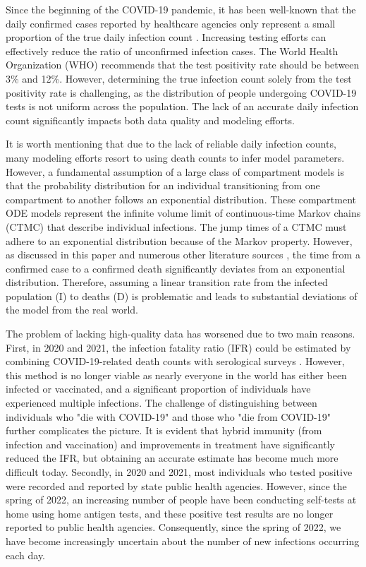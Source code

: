 \documentclass[sn-mathphys,Numbered]{sn-jnl}
\begin{document}
Since the beginning of the COVID-19 pandemic, it has been well-known that the daily confirmed cases reported by healthcare agencies only represent a small proportion of the true daily infection count \cite{wu2020substantial}. Increasing testing efforts can effectively reduce the ratio of unconfirmed infection cases. The World Health Organization (WHO) recommends that the test positivity rate should be between 3\% and 12\%. However, determining the true infection count solely from the test positivity rate is challenging, as the distribution of people undergoing COVID-19 tests is not uniform across the population. The lack of an accurate daily infection count significantly impacts both data quality and modeling efforts. 


It is worth mentioning that due to the lack of reliable daily infection counts, many modeling efforts resort to using death counts to infer model parameters. However, a fundamental assumption of a large class of compartment models is that the probability distribution for an individual transitioning from one compartment to another follows an exponential distribution. These compartment ODE models represent the infinite volume limit of continuous-time Markov chains (CTMC) that describe individual infections. The jump times of a CTMC must adhere to an exponential distribution because of the Markov property. However, as discussed in this paper and numerous other literature sources  \cite{scheiner2020mathematical,feng2007epidemiological,ghosh2022epidemic}, the time from a confirmed case to a confirmed death significantly deviates from an exponential distribution. Therefore, assuming a linear transition rate from the infected population (I) to deaths (D) is problematic and leads to substantial deviations of the model from the real world.

The problem of lacking high-quality data has worsened due to two main reasons. First, in 2020 and 2021, the infection fatality ratio (IFR) could be estimated by combining COVID-19-related death counts with serological surveys  \cite{IHME, brazeau2022estimating, meyerowitz2020systematic}. However, this method is no longer viable as nearly everyone in the world has either been infected or vaccinated, and a significant proportion of individuals have experienced multiple infections. The challenge of distinguishing between individuals who "die with COVID-19" and those who "die from COVID-19" further complicates the picture. It is evident that hybrid immunity (from infection and vaccination) and improvements in treatment have significantly reduced the IFR, but obtaining an accurate estimate has become much more difficult today. Secondly, in 2020 and 2021, most individuals who tested positive were recorded and reported by state public health agencies. However, since the spring of 2022, an increasing number of people have been conducting self-tests at home using home antigen tests, and these positive test results are no longer reported to public health agencies. Consequently, since the spring of 2022, we have become increasingly uncertain about the number of new infections occurring each day.  
\end{document}
